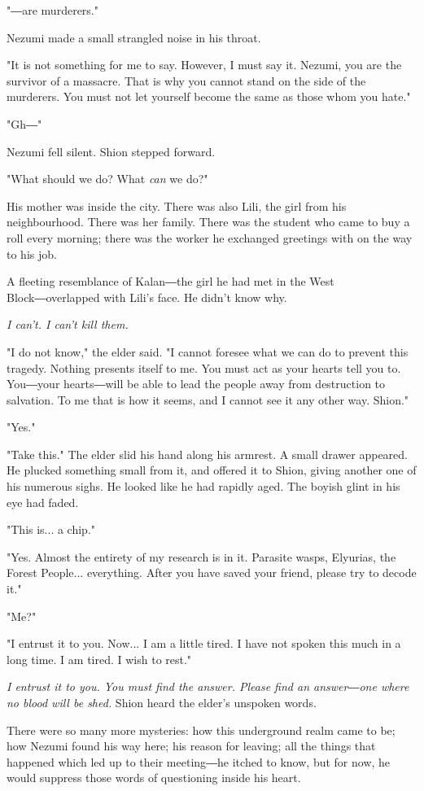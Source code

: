 "―are murderers."

Nezumi made a small strangled noise in his throat.

"It is not something for me to say. However, I must say it. Nezumi, you
are the survivor of a massacre. That is why you cannot stand on the side
of the murderers. You must not let yourself become the same as those
whom you hate."

"Gh―"

Nezumi fell silent. Shion stepped forward.

"What should we do? What \emph{can} we do?"

His mother was inside the city. There was also Lili, the girl from his
neighbourhood. There was her family. There was the student who came to
buy a roll every morning; there was the worker he exchanged greetings
with on the way to his job.

A fleeting resemblance of Kalan―the girl he had met in the West
Block―overlapped with Lili's face. He didn't know why.

\emph{I can't. I can't kill them.}

"I do not know," the elder said. "I cannot foresee what we can do to
prevent this tragedy. Nothing presents itself to me. You must act as
your hearts tell you to. You―your hearts―will be able to lead the people
away from destruction to salvation. To me that is how it seems, and I
cannot see it any other way. Shion."

"Yes."

"Take this." The elder slid his hand along his armrest. A small drawer
appeared. He plucked something small from it, and offered it to Shion,
giving another one of his numerous sighs. He looked like he had rapidly
aged. The boyish glint in his eye had faded.

"This is... a chip."

"Yes. Almost the entirety of my research is in it. Parasite wasps,
Elyurias, the Forest People... everything. After you have saved your
friend, please try to decode it."

"Me?"

"I entrust it to you. Now... I am a little tired. I have not spoken this
much in a long time. I am tired. I wish to rest."

\emph{I entrust it to you. You must find the answer. Please find an answer―one
	where no blood will be shed.} Shion heard the elder's unspoken words.

There were so many more mysteries: how this underground realm came to
be; how Nezumi found his way here; his reason for leaving; all the
things that happened which led up to their meeting―he itched to know,
but for now, he would suppress those words of questioning inside his
heart.

